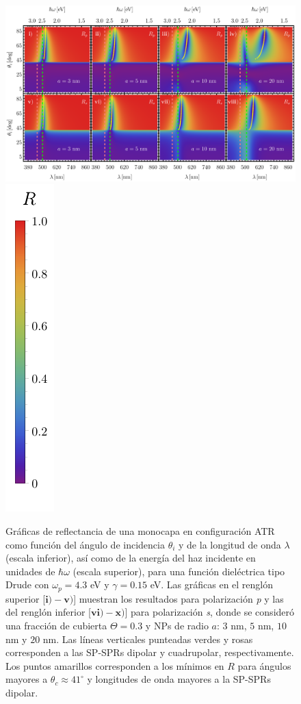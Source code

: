 	\begin{figure}[h!]\centering
\includegraphics[width = .9\linewidth]{2-Resultados/figs/3-Wp4rVar/0-2D_Grid}%
\includegraphics[scale=1, trim={00 -15 00 00}, clip]{2-Resultados/figs/0-RBar_v}
	\caption{Gráficas de reflectancia de una monocapa en configuración ATR como función del ángulo de incidencia $\theta_i$ y de la longitud de onda $\lambda$ (escala inferior), así como de la energía del haz incidente en unidades de $\hbar\omega$ (escala superior), para una función dieléctrica tipo Drude con $\omega_p=4.3$ eV  y  $\gamma=0. 15$ eV.  Las gráficas   en el renglón superior [$\mathbf{i)-v)}$] muestran los resultados para  polarización \emph{p} y las del renglón inferior  [$\mathbf{vi)-x)}$]  para polarización  \emph{s}, donde se consideró una fracción de cubierta $\Theta = 0.3$ y  NPs de radio  $a$: $3$ nm, $5$ nm, $10$ nm y $20$ nm.  Las líneas verticales punteadas verdes y rosas corresponden a las SP-SPRs dipolar y  cuadrupolar, respectivamente.  Los puntos amarillos corresponden a los mínimos en $R$ para ángulos mayores a $\theta_c\approx 41^\circ$ y longitudes de onda mayores a la SP-SPRs dipolar.
}	\label{fig:R-RVar}	
	\end{figure}	

